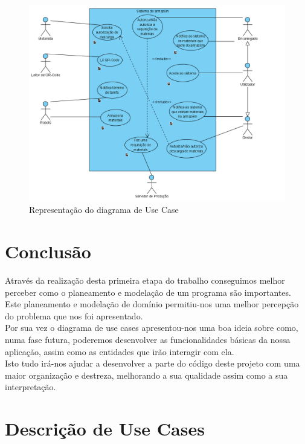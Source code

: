 \documentclass[a4paper]{report}
\begin{document}
\begin{figure}[H]
\begin{center}
\includegraphics[scale=0.60]{images/UC.PNG}
\caption{\label{fig:UC}Representação do diagrama de Use Case}
\end{center}
\end{figure}

\chapter{Conclusão}
Através da realização desta primeira etapa do trabalho conseguimos melhor perceber como o planeamento e modelação de um programa são importantes.\\

Este planeamento e modelação de domínio permitiu-nos uma melhor percepção do problema que nos foi apresentado.\\
Por sua vez o diagrama de use cases apresentou-nos uma boa ideia sobre como, numa fase futura, poderemos desenvolver as funcionalidades básicas da nossa aplicação, assim como as entidades que irão interagir com ela.\\

Isto tudo irá-nos ajudar a desenvolver a parte do código deste projeto com uma maior organização e destreza, melhorando a sua qualidade assim como a sua interpretação.\\

\appendix
\chapter{Descrição de Use Cases}
\label{appendix:a1}
\end{document}

